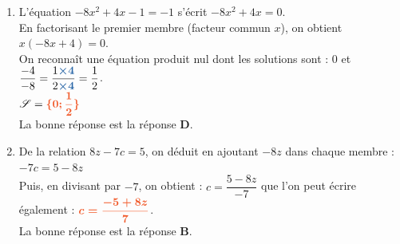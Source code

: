 \documentclass[a4paper,11pt]{article}
\begin{document}
\begin{seance}{}
\begin{enumerate}
\item L'équation $-8x^2+4x-1=-1$ s'écrit $-8x^2+4x=0$.\\
          En factorisant le premier membre (facteur commun $x$), on obtient $x(-8x+4)=0$.\\
          On reconnaît une équation produit nul dont les solutions sont : $0$ et $\dfrac{-4}{-8}=\dfrac{1{\color[HTML]{2563a5}\boldsymbol{\times4}} }{2{\color[HTML]{2563a5}\boldsymbol{\times4}}}=\dfrac{1}{2}$.\\
          $\mathscr{S}={\color[HTML]{F15929}\boldsymbol{\{0;\dfrac{1}{2}\}}}$\\La bonne réponse est la réponse {\bfseries \color[HTML]{F15929}D}.

\item De la relation $8z-7c=5$, on déduit en ajoutant $-8z$ dans chaque membre :
          $-7c=5-8z$\\ Puis, en divisant par $-7$, on obtient : $c=\dfrac{5-8z}{-7}$ que l'on peut écrire également : ${\color[HTML]{F15929}\boldsymbol{ c=\dfrac{-5+8z}{7}}}$.\\La bonne réponse est la réponse {\bfseries \color[HTML]{F15929}B}.

\end{enumerate}

\end{seance}
\end{document}
